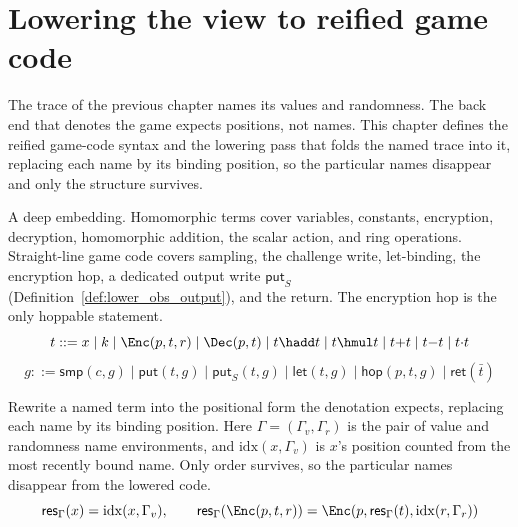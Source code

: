 \chapter{Lowering the view to reified game code}

The trace of the previous chapter names its values and randomness. The back end
that denotes the game expects positions, not names. This chapter defines the
reified game-code syntax and the lowering pass that folds the named trace into
it, replacing each name by its binding position, so the particular names
disappear and only the structure survives.

\begin{definition}
  \label{def:embedding}
  \rocqok
  A deep embedding. Homomorphic terms cover variables, constants, encryption,
  decryption, homomorphic addition, the scalar action, and ring operations.
  Straight-line game code covers sampling, the challenge write, let-binding, the
  encryption hop, a dedicated output write $\mathsf{put}_S$
  (Definition~\ref{def:lower_obs_output}), and the return. The encryption hop is
  the only hoppable statement.
  \[ t ::= x \mid k \mid \Enc(p,t,r) \mid \Dec(p,t) \mid t\hadd t \mid t\hmul t
        \mid t{+}t \mid t{-}t \mid t{\cdot}t \]
  \[ g ::= \mathsf{smp}(c,g) \mid \mathsf{put}(t,g) \mid \mathsf{put}_S(t,g)
        \mid \mathsf{let}(t,g) \mid \mathsf{hop}(p,t,g) \mid \mathsf{ret}(\bar t) \]
\end{definition}

\begin{definition}
  \label{def:resolve_term}
  \rocqok
  Rewrite a named term into the positional form the denotation expects, replacing
  each name by its binding position. Here $\Gamma = (\Gamma_v, \Gamma_r)$ is the
  pair of value and randomness name environments, and $\mathrm{idx}(x,\Gamma_v)$
  is $x$'s position counted from the most recently bound name. Only order
  survives, so the particular names disappear from the lowered code.
  \[ \mathsf{res}_\Gamma(x) = \mathrm{idx}(x,\Gamma_v), \qquad
        \mathsf{res}_\Gamma(\Enc(p,t,r)) =
        \Enc(p, \mathsf{res}_\Gamma(t), \mathrm{idx}(r,\Gamma_r)) \]
\end{definition}

